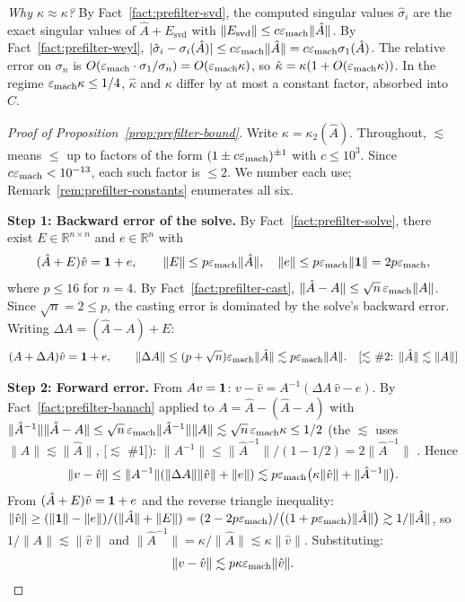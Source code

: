 \medskip
\noindent
\textit{Why $\hat\kappa \approx \kappa$?}
By Fact~\ref{fact:prefilter-svd}, the computed singular values
$\hat\sigma_i$ are the exact singular values of
$\hat{A} + E_{\mathrm{svd}}$ with
$\|E_{\mathrm{svd}}\| \le c\varepsilon_{\mathrm{mach}}\|\hat{A}\|$.
By Fact~\ref{fact:prefilter-weyl},
$|\hat\sigma_i - \sigma_i(\hat{A})| \le c\varepsilon_{\mathrm{mach}}\|\hat{A}\|
= c\varepsilon_{\mathrm{mach}}\sigma_1(\hat{A})$.
The relative error on $\sigma_n$ is
$O(\varepsilon_{\mathrm{mach}} \cdot \sigma_1/\sigma_n) = O(\varepsilon_{\mathrm{mach}}\kappa)$,
so $\hat\kappa = \kappa(1 + O(\varepsilon_{\mathrm{mach}}\kappa))$.
In the regime $\varepsilon_{\mathrm{mach}}\kappa \le 1/4$,
$\hat\kappa$ and $\kappa$ differ by at most a constant
factor, absorbed into $C$.

\begin{unverified}
\begin{proof}[Proof of Proposition~\ref{prop:prefilter-bound}]
Write $\kappa = \kappa_2(\hat{A})$.
Throughout, $\lesssim$ means $\le$ up to factors of the
form $(1 \pm c\varepsilon_{\mathrm{mach}})^{\pm 1}$ with $c \le 10^3$.
Since $c\varepsilon_{\mathrm{mach}} < 10^{-13}$, each such factor is $\le 2$.
We number each use; Remark~\ref{rem:prefilter-constants}
enumerates all six.

\medskip\noindent\textbf{Step 1: Backward error of the solve.}
By Fact~\ref{fact:prefilter-solve}, there exist
$E \in \mathbb{R}^{n \times n}$ and
$e \in \mathbb{R}^n$ with
\[
  (\hat{A} + E)\hat{v} = \mathbf{1} + e, \qquad
  \|E\| \le p\varepsilon_{\mathrm{mach}}\|\hat{A}\|, \quad
  \|e\| \le p\varepsilon_{\mathrm{mach}}\|\mathbf{1}\| = 2p\varepsilon_{\mathrm{mach}},
\]
where $p \le 16$ for $n = 4$.
By Fact~\ref{fact:prefilter-cast},
$\|\hat{A} - A\| \le \sqrt{n}\,\varepsilon_{\mathrm{mach}}\|A\|$.
Since $\sqrt{n} = 2 \le p$, the casting error
is dominated by the solve's backward error.
Writing $\Delta A = (\hat{A} - A) + E$:
\[
  (A + \Delta A)\hat{v} = \mathbf{1} + e, \qquad
  \|\Delta A\| \le (p + \sqrt{n})\varepsilon_{\mathrm{mach}}\|\hat{A}\|
  \lesssim p\varepsilon_{\mathrm{mach}}\|A\|.
  \quad\text{[$\lesssim$ \#2: $\|\hat{A}\| \lesssim \|A\|$]}
\]

\medskip\noindent\textbf{Step 2: Forward error.}
From $Av = \mathbf{1}$:
$v - \hat{v} = A^{-1}(\Delta A\,\hat{v} - e)$.
By Fact~\ref{fact:prefilter-banach}
applied to $A = \hat{A} - (\hat{A} - A)$
with $\|\hat{A}^{-1}\|\|\hat{A} - A\| \le
\sqrt{n}\,\varepsilon_{\mathrm{mach}}\|\hat{A}^{-1}\|\|A\|
\lesssim \sqrt{n}\,\varepsilon_{\mathrm{mach}}\kappa \le 1/2$
(the $\lesssim$ uses $\|A\| \lesssim \|\hat{A}\|$,
[$\lesssim$ \#1]):
$\|A^{-1}\| \le \|\hat{A}^{-1}\|/(1 - 1/2)
= 2\|\hat{A}^{-1}\|$
\quad[$\lesssim$ \#3].
Hence
\begin{equation}\label{eq:prefilter-fwd}
  \|v - \hat{v}\| \le \|A^{-1}\|(\|\Delta A\|\|\hat{v}\| + \|e\|)
  \lesssim
  p\varepsilon_{\mathrm{mach}}\bigl(\kappa\|\hat{v}\| + \|\hat{A}^{-1}\|\bigr).
\end{equation}
From $(\hat{A} + E)\hat{v} = \mathbf{1} + e$
and the reverse triangle inequality:
$\|\hat{v}\| \ge
(\|\mathbf{1}\| - \|e\|)/(\|\hat{A}\| + \|E\|)
= (2 - 2p\varepsilon_{\mathrm{mach}})/\bigl((1 + p\varepsilon_{\mathrm{mach}})\|\hat{A}\|\bigr)
\gtrsim 1/\|\hat{A}\|$,
so $1/\|\hat{A}\| \lesssim \|\hat{v}\|$
\quad[$\lesssim$ \#4]
and $\|\hat{A}^{-1}\| = \kappa/\|\hat{A}\|
\lesssim \kappa\|\hat{v}\|$.
Substituting:
\begin{equation}\label{eq:prefilter-fwd2}
  \|v - \hat{v}\| \lesssim p\kappa\varepsilon_{\mathrm{mach}}\|\hat{v}\|.
\end{equation}


\end{proof}
\end{unverified}
